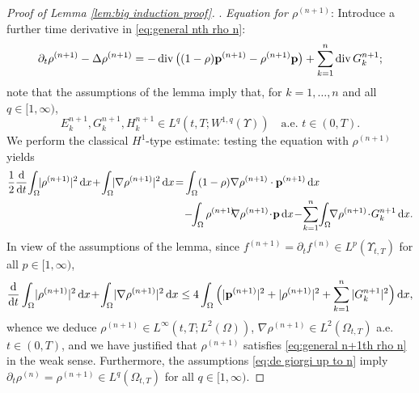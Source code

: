 \documentclass[11pt,a4paper,reqno]{amsart}
\theoremstyle{remark}
\theoremstyle{definition}
\numberwithin{equation}{section}
\DeclareMathOperator{\dv}{div}
\newcommand{\p}{{\bf p}}
\renewcommand{\d}{\, \mathrm{d} }
\newcommand{\der}{\mathrm{d}}
\newcommand{\rr}[1]{\rho^{(#1)}}
\def\de{\partial}
\begin{document}
\begin{proof}[Proof of Lemma \ref{lem:big induction proof}]
. \textit{Equation for $\rho^{(n+1)}$}: Introduce a further time derivative in \eqref{eq:general nth rho n}: 
\begin{equation}\label{eq:general n+1th rho n}
        \begin{aligned}
    \de_t \rr{n+1} - \Delta \rr{n+1} = -  \dv 
    \big( (1- \rho) \p^{(n+1)} -\rr{n+1} \p\big) + \sum_{k=1}^{n} \dv G^{n+1}_k; 
\end{aligned}
\end{equation}
note that the assumptions of the lemma imply that, for $k=1,\dots,n$ and all $q\in[1,\infty)$, 
\begin{equation}\label{eq:boundedness of En+1k G}
E^{n+1}_k , G^{n+1}_k , H^{n+1}_k \in L^q(t,T; W^{1,q}(\Upsilon)) \quad \text{a.e.~}t \in (0,T). 
\end{equation}
We perform the classical $H^1$-type estimate: testing the equation with $\rho^{(n+1)}$ yields 
\begin{equation*}
    \begin{aligned}
        \frac{1}{2}\frac{\der}{\der t}\!\int_\Omega\!\! |\rho^{(n+1)}|^2 \d x \!+\! \int_\Omega\!\! |\nabla \rho^{(n+1)}|^2 \d x \! = \! & \, \int_\Omega (1-\rho) \nabla \rho^{(n+1)} \cdot \p^{(n+1)} \d x \\ 
        &- \!\! \int_\Omega \rho^{(n+1)} \!\!\nabla\rho^{(n+1)} \!\cdot\! \p \d x \!-\! \sum_{k=1}^n \!\int_\Omega\!\! \nabla \rho^{(n+1)} \!\cdot\! G^{n+1}_k \d x. 
    \end{aligned}
\end{equation*}
In view of the assumptions of the lemma, since $f^{(n+1)} = \partial_t f^{(n)} \in L^p(\Upsilon_{t,T})$ for all $p\in[1,\infty)$, 
\begin{equation*}
    \begin{aligned}
       \frac{\der}{\der t}\int_\Omega \! |\rho^{(n+1)}|^2 \d x \!+\! \int_\Omega \! |\nabla \rho^{(n+1)}|^2 \d x \leq 4 \int_\Omega \Big(  |\p^{(n+1)}|^2 +  |\rho^{(n+1)}|^2 + \sum_{k=1}^n  |G^{n+1}_k|^2 \Big) \d x, 
    \end{aligned}
\end{equation*}
whence we deduce $\rho^{(n+1)} \in L^\infty(t,T;L^2(\Omega))$, $\nabla \rho^{(n+1)} \in L^2(\Omega_{t,T})$ {a.e.~}$t\in(0,T)$, and we have justified that $\rho^{(n+1)}$ satisfies \eqref{eq:general n+1th rho n} in the weak sense. Furthermore, the assumptions \eqref{eq:de giorgi up to n} imply $\partial_t \rho^{(n)} = \rho^{(n+1)} \in L^q(\Omega_{t,T})$ for all $q \in [1,\infty)$. 



\end{proof}
\end{document}
